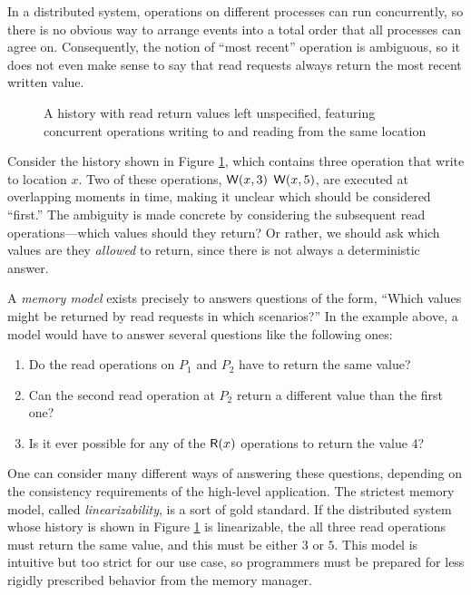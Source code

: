 \documentclass[]             %
{NASA}                       %
\theoremstyle{definition}
\newtheorem{example}[theorem]{Example}
\begin{document}
In a distributed system, operations on different processes can run
concurrently, so there is no obvious way to arrange events into a
total order that all processes can agree on. Consequently, the notion
of ``most recent'' operation is ambiguous, so it does not even make
sense to say that read requests always return the most recent written
value.

\begin{figure}[h]
  
  \caption{A history with read return values left unspecified,
    featuring concurrent operations writing to and reading from the
    same location}
  \label{fig:dsm-example-2}
\end{figure}


Consider the history shown in Figure \ref{fig:dsm-example-2}, which
contains three operation that write to location $x$. Two of these
operations, $\mathsf{W}\!\left(x, 3\right)$ $\mathsf{W}\!\left(x, 5\right)$, are executed at
overlapping moments in time, making it unclear which should be
considered ``first.'' The ambiguity is made concrete by considering
the subsequent read operations---which values should they return? Or
rather, we should ask which values are they \emph{allowed} to return,
since there is not always a deterministic answer.

A \emph{memory model} exists precisely to answers questions of the
form, ``Which values might be returned by read requests in which
scenarios?'' In the example above, a model would have to answer
several questions like the following ones:
\begin{enumerate}
\item Do the read operations on $P_1$ and $P_2$ have to return the same value?
\item Can the second read operation at $P_2$ return a different value
  than the first one?
\item Is it ever possible for any of the $\mathsf{R}\!\left(x\right)$ operations to
  return the value 4?
\end{enumerate}

One can consider many different ways of answering these questions,
depending on the consistency requirements of the high-level
application. The strictest memory model, called
\emph{linearizability}, is a sort of gold standard. If the distributed
system whose history is shown in Figure \ref{fig:dsm-example-2} is
linearizable, the all three read operations must return the same
value, and this must be either $3$ or $5$. This model is intuitive but
too strict for our use case, so programmers must be prepared for less
rigidly prescribed behavior from the memory manager.
\end{document}
